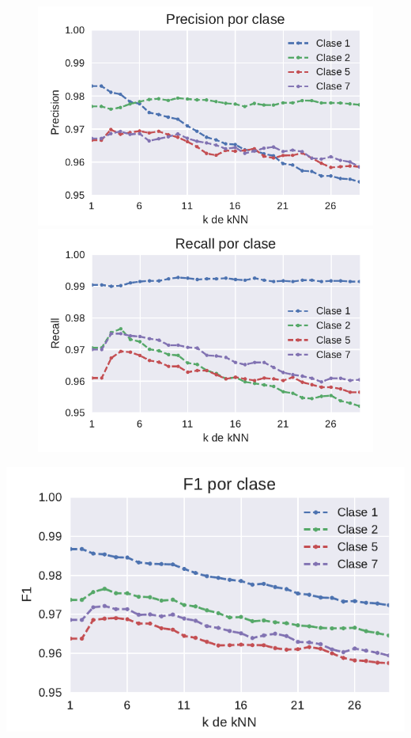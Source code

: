 \begin{figure}[H]
\centering
\begin{minipage}{.5\textwidth}
  \centering
  \includegraphics[width=1.0\linewidth]{informe/imagenes/pca/variacionKPrecision1257.pdf}
\end{minipage}%
\begin{minipage}{.5\textwidth}
  \centering
    \includegraphics[width=1.0\linewidth]{informe/imagenes/pca/variacionKRecall1257.pdf}
\end{minipage}
\end{figure}


{\centering
  \includegraphics[width=0.5\linewidth]{informe/imagenes/pca/variacionKF11257.pdf}
}

